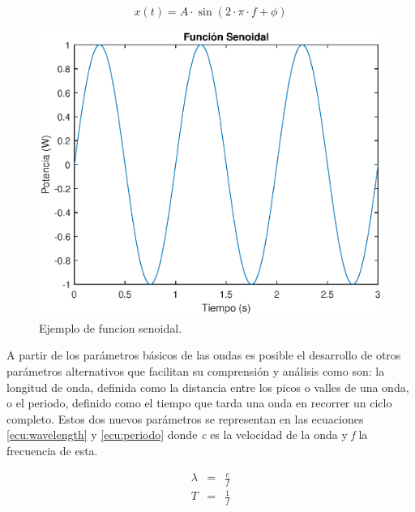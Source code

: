 \begin{equation}
	x(t)=A\cdot \sin(2\cdot\pi\cdot f+\phi )
	\label{eq: seno}
\end{equation}

\begin{figure}[h]
    \centering
        \includegraphics[width=15cm]{archivos/seno}
        \caption{Ejemplo de funcion senoidal.}
        \label{fig:seno}
\end{figure}

\par A partir de los parámetros básicos de las ondas es posible el desarrollo de otros parámetros alternativos que facilitan su comprensión y análisis como son: la longitud de onda, definida como la distancia entre los picos o valles de una onda, o el periodo, definido como el tiempo que tarda una onda en recorrer un ciclo completo. Estos dos nuevos parámetros se representan en las ecuaciones \ref{ecu:wavelength} y \ref{ecu:periodo} donde \textit{c} es la velocidad de la onda y \textit{f} la frecuencia de esta.

\begin{subequations}
	\begin{eqnarray}
		\lambda &=& \frac{c}{f} \label{ecu:wavelength} \\ %
		T &=& \frac{1}{f} \label{ecu:periodo}
	\end{eqnarray}
\end{subequations}

